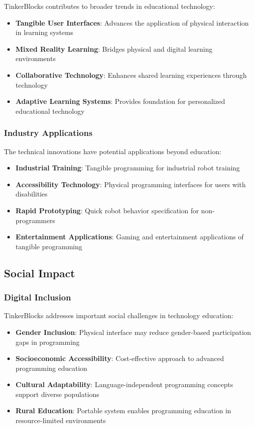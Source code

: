 TinkerBlocks contributes to broader trends in educational technology:

\begin{itemize}
    \item \textbf{Tangible User Interfaces}: Advances the application of physical interaction in learning systems
    \item \textbf{Mixed Reality Learning}: Bridges physical and digital learning environments
    \item \textbf{Collaborative Technology}: Enhances shared learning experiences through technology
    \item \textbf{Adaptive Learning Systems}: Provides foundation for personalized educational technology
\end{itemize}

\subsubsection{Industry Applications}

The technical innovations have potential applications beyond education:

\begin{itemize}
    \item \textbf{Industrial Training}: Tangible programming for industrial robot training
    \item \textbf{Accessibility Technology}: Physical programming interfaces for users with disabilities
    \item \textbf{Rapid Prototyping}: Quick robot behavior specification for non-programmers
    \item \textbf{Entertainment Applications}: Gaming and entertainment applications of tangible programming
\end{itemize}

\subsection{Social Impact}

\subsubsection{Digital Inclusion}

TinkerBlocks addresses important social challenges in technology education:

\begin{itemize}
    \item \textbf{Gender Inclusion}: Physical interface may reduce gender-based participation gaps in programming
    \item \textbf{Socioeconomic Accessibility}: Cost-effective approach to advanced programming education
    \item \textbf{Cultural Adaptability}: Language-independent programming concepts support diverse populations
    \item \textbf{Rural Education}: Portable system enables programming education in resource-limited environments
\end{itemize}

